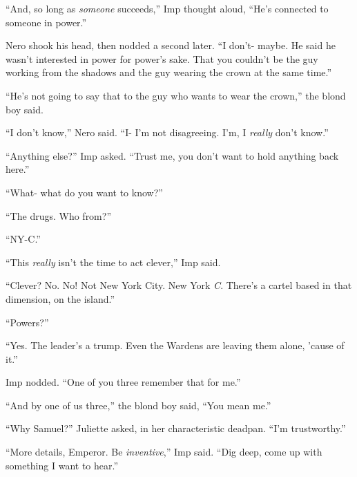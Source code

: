 ``And, so long as \emph{someone} succeeds,'' Imp thought aloud, ``He's connected to someone in power.''



Nero shook his head, then nodded a second later.  ``I don't- maybe.  He said he wasn't interested in power for power's sake.  That you couldn't be the guy working from the shadows and the guy wearing the crown at the same time.''



``He's not going to say that to the guy who wants to wear the crown,'' the blond boy said.



``I don't know,'' Nero said.  ``I- I'm not disagreeing.  I'm, I \emph{really} don't know.''



``Anything else?''  Imp asked.  ``Trust me, you don't want to hold anything back here.''



``What- what do you want to know?''



``The drugs.  Who from?''



``NY-C.''



``This \emph{really} isn't the time to act clever,'' Imp said.



``Clever?  No.  No!  Not New York City.  New York \emph{C}.  There's a cartel based in that dimension, on the island.''



``Powers?''



``Yes.  The leader's a trump.  Even the Wardens are leaving them alone, 'cause of it.''



Imp nodded.  ``One of you three remember that for me.''



``And by one of us three,'' the blond boy said, ``You mean me.''



``Why Samuel?'' Juliette asked, in her characteristic deadpan.  ``I'm trustworthy.''



``More details, Emperor.  Be \emph{inventive},'' Imp said.  ``Dig deep, come up with something I want to hear.''



